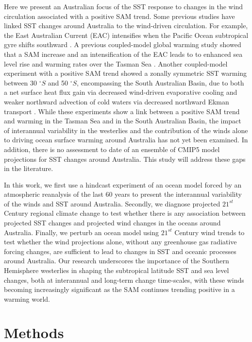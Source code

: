 \documentclass[draft,linenumbers]{agujournal2018}
\begin{document}
Here we present an Australian focus of the SST response to changes in the wind circulation associated with a positive SAM trend. Some previous studies have linked SST changes around Australia to the wind-driven circulation. For example, the East Australian Current (EAC) intensifies when the Pacific Ocean subtropical gyre shifts southward \citep{Hill2011}. A previous coupled-model global warming study showed that a SAM increase and an intensification of the EAC leads to to enhanced sea level rise and warming rates over the Tasman Sea \citep{Cai2005}. Another coupled-model experiment with a positive SAM trend showed a zonally symmetric SST warming between 30 $^{\circ}S$ and 50 $^{\circ}S$, encompassing the South Australian Basin, due to both a net surface heat flux gain via decreased wind-driven evaporative cooling and weaker northward advection of cold waters via decreased northward Ekman transport \citep{SenGupta2006}. While these experiments show a link between a positive SAM trend and warming in the Tasman Sea and in the South Australian Basin, the impact of interannual variability in the westerlies and the contribution of the winds alone to driving ocean surface warming around Australia has not yet been examined. In addition, there is no assessment to date of an ensemble of CMIP5 model projections for SST changes around Australia. This study will address these gaps in the literature.

In this work, we first use a hindcast experiment of an ocean model forced by an atmospheric reanalysis of the last 60 years to present the interannual variability of the winds and SST around Australia. Secondly, we diagnose projected $21^{st}$ Century regional climate change to test whether there is any association between projected SST changes and projected wind changes in the oceans around Australia. Finally, we perturb an ocean model using $21^{st}$ Century wind trends to test whether the wind projections alone, without any greenhouse gas radiative forcing changes, are sufficient to lead to changes in SST and oceanic processes around Australia. Our research underscores the importance of the Southern Hemisphere westerlies in shaping the subtropical latitude SST and sea level changes, both at interannual and long-term change time-scales, with these winds becoming increasingly significant as the SAM continues trending positive in a warming world.



\section{Methods}
\end{document}
